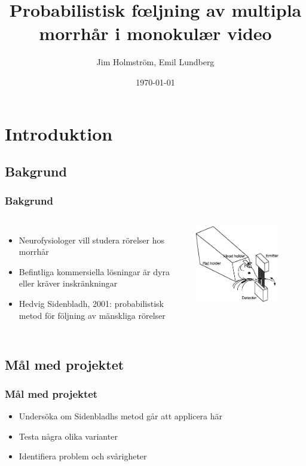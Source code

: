 \documentclass[]{beamer}
\title{Probabilistisk f\oe ljning av multipla morrh\aa r i monokul\ae r video}
\author{Jim Holmstr\"{o}m, Emil Lundberg}                 %
\institute{CSC,KTH}      %
\date{\today}                    %
\renewcommand{\ae}{\"{a}}
\renewcommand{\oe}{\"{o}}
\begin{document}
\begin{frame}
  \titlepage
\end{frame}


\section{Introduktion}

\subsection{Bakgrund}
\begin{frame}
  \frametitle{Bakgrund}
  \begin{columns}[c]
    \column{2in}
    \begin{itemize}
    \item Neurofysiologer vill studera rörelser hos morrh\aa r
    \item Befintliga kommersiella l\oe sningar \ae r dyra eller kr\ae ver inskr\ae nkningar
    \item Hedvig Sidenbladh, 2001: probabilistisk metod f\oe r f\oe ljning av m\ae nskliga r\oe relser
    \end{itemize}
    \column{2in}
    \includegraphics[width=0.75\textwidth]{optoelectronic.png}
  \end{columns}
\end{frame}

\subsection{M\aa l med projektet}
\begin{frame}
  \frametitle{M\aa l med projektet}
  \begin{itemize}
  \item Unders\oe ka om Sidenbladhs metod g\aa r att applicera h\ae r
  \item Testa n\aa gra olika varianter
  \item Identifiera problem och sv\aa righeter
  \end{itemize}
\end{frame}
\end{document}

